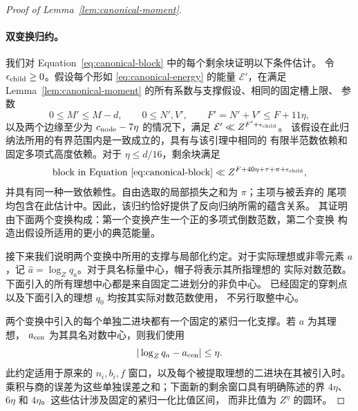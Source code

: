 \documentclass[11pt,a4paper]{article}
\numberwithin{equation}{section}
\numberwithin{figure}{section}
\theoremstyle{definition}
\theoremstyle{remark}
\begin{document}
\begin{proof}[Proof of Lemma~\ref{lem:canonical-moment}]
\paragraph{双变换归约。}
我们对 Equation~\eqref{eq:canonical-block} 中的每个剩余块证明以下条件估计。
令 \(\epsilon_{\rm child}\ge0\)。假设每个形如
\eqref{eq:canonical-energy} 的能量 \(\mathcal E'\)，在满足
Lemma~\ref{lem:canonical-moment} 的所有系数与支撑假设、相同的固定槽上限、
参数
\[
 0\le M'\le M-d,\qquad 0\le N',V',\qquad F'=N'+V'\le F+11\eta,
\]
以及两个边缘至少为 \(c_{\rm node}-7\eta\) 的情况下，满足
\(\mathcal E'\ll Z^{F'+\epsilon_{\rm child}}\)。
该假设在此归纳法所用的有界范围内是一致成立的，具有与该引理中相同的
有限半范数依赖和固定多项式高度依赖。对于
\(\eta\le d/16\)，剩余块满足
\begin{equation}\label{eq:canonical-reduction-contract}
 \text{block in Equation~\eqref{eq:canonical-block}}
 \ll Z^{F+40\eta+\tau+\pi+\epsilon_{\rm child}},
\end{equation}
并具有同一种一致依赖性。自由选取的局部损失之和为 \(\pi\)；主项与被丢弃的
尾项均包含在此估计中。因此，该归约恰好提供了反向归纳所需的蕴含关系。
其证明由下面两个变换构成：第一个变换产生一个正的多项式倒数范数，第二个变换
构造出假设所适用的更小的典范能量。

接下来我们说明两个变换中所用的支撑与局部化约定。对于实际理想或非零元素
\(a\)，记 \(\widehat a=\log_Zq_a\)。对于具名标量中心，帽子将表示其所指理想的
实际对数范数。下面引入的所有理想中心都是来自固定二进划分的非负中心。
已经固定的穿刺点以及下面引入的理想 \(q_0\) 均按其实际对数范数使用，
不另行取整中心。

两个变换中引入的每个单独二进块都有一个固定的紧归一化支撑。若 \(a\) 为其理想，
\(a_{\rm cen}\) 为其具名对数中心，则我们使用
\begin{equation}\label{eq:inverse-ratio-bounds}
 |\log_Zq_a-a_{\rm cen}|\le\eta.
\end{equation}
此约定适用于原来的 \(n_i,b_i,f\) 窗口，以及每个被提取理想的二进块在其被引入时。
乘积与商的误差为这些单独误差之和；下面新的剩余窗口具有明确陈述的界
\(4\eta\)、\(6\eta\) 和 \(4\eta\)。这些估计涉及固定的紧归一化比值区间，
而非比值为 \(Z^\eta\) 的圆环。


\end{proof}
\end{document}
